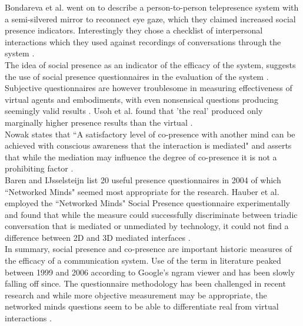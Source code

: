 			     
            Bondareva et al. went on to describe a person-to-person telepresence system with a semi-silvered mirror to reconnect eye gaze, which they claimed increased social presence indicators. Interestingly they chose a checklist of interpersonal interactions which they used against recordings of conversations through the system \cite{Bondareva2004}.  \\
            The idea of social presence as an indicator of the efficacy of the system, suggests the use of social presence questionnaires in the evaluation of the system \cite{Biocca2003}.  Subjective questionnaires are however troublesome in measuring effectiveness of virtual agents and embodiments, with even nonsensical questions producing seemingly valid results \cite{Slater2004}. Usoh et al. found that 'the real' produced only marginally higher presence results than the virtual \cite{Usoh2000a}.\\
            Nowak states that ``A satisfactory level of co-presence with another mind can be achieved with conscious awareness that the interaction is mediated" and asserts that while the mediation may influence the degree of co-presence it is not a prohibiting factor \cite{Nowak2001}.\\ 
            Baren and IJsselsteijn \cite{Baren, Harms2004} list 20 useful presence questionnaires in 2004 of which ``Networked Minds" seemed most appropriate for the research.
            Hauber et al. employed the ``Networked Minds" Social Presence questionnaire experimentally and found that while the measure could successfully discriminate between triadic conversation that is mediated or unmediated by technology, it could not find a difference between 2D and 3D mediated interfaces \cite{Hauber2005, Gunawardena1997}.
            \\In summary, social presence and co-presence are important historic measures of the efficacy of a communication system. Use of the term in literature peaked between 1999 and 2006 according to Google's ngram viewer and has been slowly falling off since. The questionnaire methodology has been challenged in recent research and while more objective measurement may be appropriate, the networked minds questions seem to be able to differentiate real from virtual interactions \cite{Harms2004}.
